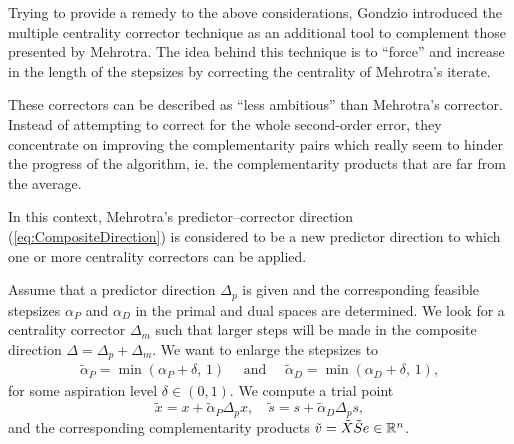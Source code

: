 Trying to provide a remedy to the above considerations, Gondzio 
\cite{Gondzio96} introduced the multiple centrality corrector technique 
as an additional tool to complement those presented by Mehrotra. 
The idea behind this technique is to ``force'' and increase in the 
length of the stepsizes by correcting the centrality of Mehrotra's 
iterate.

These correctors can be described as ``less ambitious'' than Mehrotra's
corrector. Instead of attempting to correct for the whole second-order error,
they concentrate on improving the complementarity pairs which really seem 
to hinder the progress of the algorithm, ie. the complementarity products 
that are far from the average.



In this context, Mehrotra's predictor--corrector direction 
(\ref{eq:CompositeDirection}) is considered to be a new predictor direction
to which one or more centrality correctors can be applied. 

Assume that a predictor direction $\Delta_p$ is given and the corresponding
feasible stepsizes $\alpha_{P}$ and $\alpha_{D}$ 
in the primal and dual spaces are 
determined. We look for a centrality corrector $\Delta_m$ such that larger
steps will be made in the composite direction $\Delta = \Delta_p + \Delta_m$.
We want to enlarge the stepsizes to 
%
\begin{eqnarray*} 
   \tilde{\alpha}_{P} = \min(\alpha_{P} \! + \! \delta, \,1) 
   \quad \mbox{ and } \quad
   \tilde{\alpha}_{D} = \min(\alpha_{D} \! + \! \delta, \,1), 
\end{eqnarray*}
%
for some aspiration level $\delta \in(0,1)$. We compute a trial point
%
\[
  \tilde{x} = x + \tilde{\alpha}_{P} \Delta_{p} x, \quad 
  \tilde{s} = s + \tilde{\alpha}_{D} \Delta_{p} s,
\]
%
and the corresponding complementarity products 
$\tilde v = \tilde X \tilde S e \in \mathbb{R}^{n}$.

